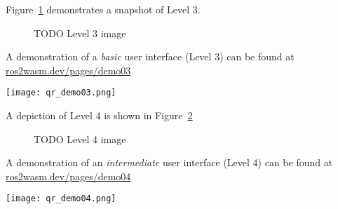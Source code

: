         Figure~\ref{fig:ui3} demonstrates a snapshot of Level 3.

        \begin{figure}[htbp]
            \centering
            \caption{TODO Level 3 image}\label{fig:ui3}
        \end{figure}

        \begin{tcolorbox}[title=Example 3]
            \begin{minipage}[t]{0.87\linewidth}
                \vspace*{0.5\baselineskip}
                A demonstration of a \textit{basic} user interface (Level 3) can
                be found at \href{https://ros2wasm.dev/pages/demo03/index.html}{\textsf{ros2wasm.dev/pages/demo03}}
            \end{minipage}\hfill%
            \begin{minipage}[t]{0.1\linewidth}
                \vspace*{0pt}
                \texttt{[image: qr\_demo03.png]}
            \end{minipage}
        \end{tcolorbox}

        A depiction of Level 4 is shown in Figure~\ref{fig:ui4}

        \begin{figure}[htbp]
            \centering
            \caption{TODO Level 4 image}\label{fig:ui4}
        \end{figure}

        \begin{tcolorbox}[title=Example 4]
            \begin{minipage}[t]{0.87\linewidth}
                \vspace*{0.5\baselineskip}
                A demonstration of an \textit{intermediate} user interface (Level 4) can
                be found at \href{https://ros2wasm.dev/pages/demo04/index.html}{\textsf{ros2wasm.dev/pages/demo04}}
            \end{minipage}\hfill%
            \begin{minipage}[t]{0.1\linewidth}
                \vspace*{0pt}
                \texttt{[image: qr\_demo04.png]}
            \end{minipage}
        \end{tcolorbox}

